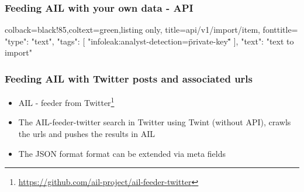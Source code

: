 \documentclass{beamer}
\begin{document}
\begin{frame}[fragile]
    \frametitle{Feeding AIL with your own data - API}
    \begin{tcblisting}{colback=black!85,coltext=green,listing only,
        title=api/v1/import/item, fonttitle=\bfseries}
{
  "type": "text",
  "tags": [
    "infoleak:analyst-detection=\"private-key\""
  ],
  "text": "text to import"
}
\end{tcblisting}
 
\end{frame}

\begin{frame}[fragile]
   \frametitle{Feeding AIL with Twitter posts and associated urls}
        \begin{itemize}
                \item AIL - feeder from Twitter\footnote{\url{https://github.com/ail-project/ail-feeder-twitter}}
                \item The AIL-feeder-twitter search in Twitter using Twint (without API), crawls the urls and pushes the results in AIL
                \item The JSON format format can be extended via meta fields
        \end{itemize}

\end{frame}

\end{document}
